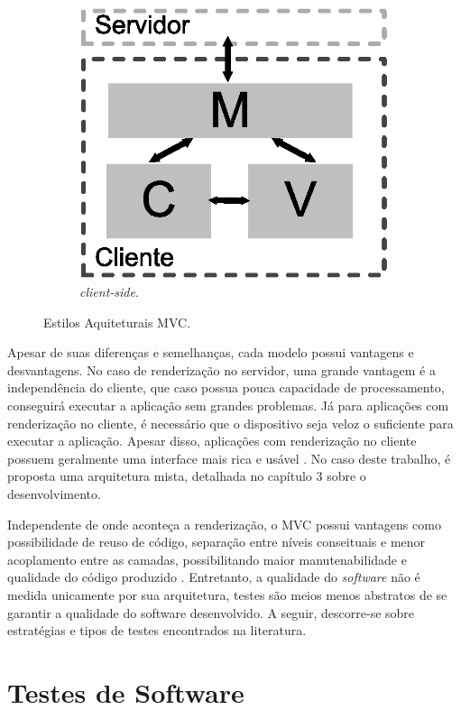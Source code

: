 \begin{figure}[h!]
\begin{subfigure}{.31\textwidth}
  		\centering
  		\includegraphics[width=.9\linewidth]{figuras/cliente.eps}
  		\caption{ \textit{client-side}.}
  		\label{fig:submvc3}
	\end{subfigure}
	\caption{Estilos Aquiteturais MVC.}
	\label{fig:mvc}
\end{figure}

Apesar de suas diferenças e semelhanças, cada modelo possui vantagens e desvantagens. No caso de renderização no servidor, uma grande vantagem é a independência do cliente, que caso possua pouca capacidade de processamento, conseguirá executar a aplicação sem grandes problemas. Já para aplicações com renderização no cliente, é necessário que o dispositivo seja veloz o suficiente para executar a aplicação. Apesar disso, aplicações com renderização no cliente possuem geralmente uma interface mais rica e usável \cite{Ubl2015}. No caso deste trabalho, é proposta uma arquitetura mista, detalhada no capítulo 3 sobre o desenvolvimento.

Independente de onde aconteça a renderização, o MVC possui vantagens como possibilidade de reuso de código, separação entre níveis conseituais e menor acoplamento entre as camadas, possibilitando maior manutenabilidade e qualidade do código produzido \cite{krasner1988}. Entretanto, a qualidade do \textit{software} não é medida unicamente por sua arquitetura, testes são meios menos abstratos de se garantir a qualidade do software desenvolvido. A seguir, descorre-se sobre estratégias e tipos de testes encontrados na literatura.

\section{Testes de Software}

